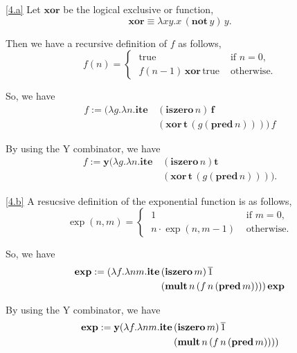\documentclass{homework}
\begin{document}
\begin{solution}

  \ref{4.a} Let $\mathbf{xor}$ be the logical exclusive or function,
  \begin{equation*}
  \mathbf{xor} \equiv \lambda xy.x\,(\mathbf{not}\, y)\, y.
  \end{equation*}

  Then we have a recursive definition of $f$ as follows,
  \begin{equation*}
    f(n)  = \begin{cases}\; \text{true} & \text{ if } n = 0,\\
              \; f(n-1)\, \mathbf{xor}\, \text{true} & \text{ otherwise.}\end{cases}
  \end{equation*}

  So, we have
  \begin{align*}
    f := (\lambda g.\lambda n.\mathbf{ite}\, & (\mathbf{iszero}\, n)\, \mathbf{f} \\
    & (\mathbf{xor}\, \mathbf{t}\,(g (\mathbf{pred}\, n))))\,f
  \end{align*}

  By using the Y combinator, we have
  \begin{align*}
    f := \mathbf{y}(\lambda g.\lambda n.\mathbf{ite}\, & (\mathbf{iszero}\, n) \mathbf{t} \\
    & (\mathbf{xor}\, \mathbf{t}\,(g (\mathbf{pred}\, n)))).
  \end{align*}

  \ref{4.b} A resucsive definition of the exponential function is as follows,
  \begin{equation*}
    \exp(n,m) = \begin{cases}\; 1 & \text{ if } m = 0,\\
              \; n\cdot \exp(n,m-1) & \text{ otherwise.}\end{cases}
  \end{equation*}

  So, we have
  \begin{align*}
    \mathbf{exp} := (\lambda f.\lambda nm. \mathbf{ite}\, & (\mathbf{iszero}\, m)\, \overline{1} \\
    & (\mathbf{mult}\, n\, (f\, n\, (\mathbf{pred}\, m) )))\, \mathbf{exp}
  \end{align*}

  By using the Y combinator, we have
  \begin{align*}
    \mathbf{exp} := \mathbf{y}(\lambda f.\lambda nm. \mathbf{ite}\, & (\mathbf{iszero}\, m)\, \overline{1} \\
    & (\mathbf{mult}\, n\, (f\, n\, (\mathbf{pred}\, m) )))
  \end{align*}


\end{solution}
\end{document}
